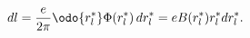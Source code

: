 \begin{equation}
\label{Eq_A14}
dl = \frac{e}{2\pi} \odo{r^{*}_l} \Phi(r^{*}_l) \, dr^{*}_l
   = eB(r^{*}_l) r^{*}_l dr^{*}_l.
\end{equation}

